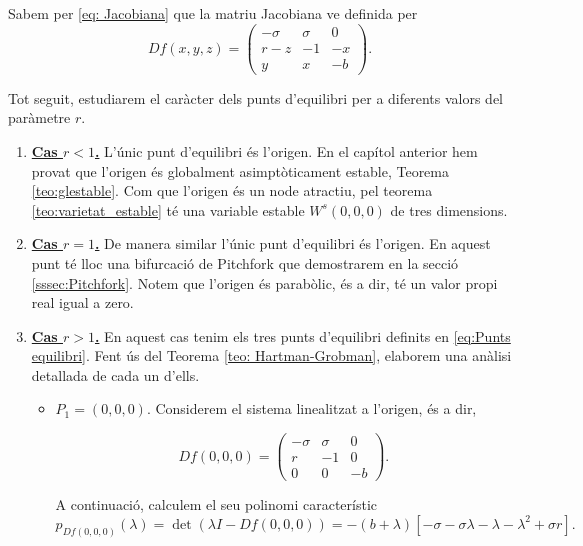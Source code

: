 \documentclass[11pt,a4paper,openright,oneside]{article}
\numberwithin{equation}{section}
\theoremstyle{definition}
\begin{document}
Sabem per \eqref{eq: Jacobiana} que la matriu Jacobiana ve definida per 
\begin{equation*} Df(x,y,z)= \begin{pmatrix}
    -\sigma & \sigma & 0\\
    r-z & -1 & -x\\
    y & x & -b
\end{pmatrix}. \end{equation*}

Tot seguit, estudiarem el caràcter dels punts d'equilibri per a diferents valors del paràmetre $r$.

\begin{enumerate}
    \item \textbf{\underline{Cas $r<1$.}} L'únic punt d'equilibri és l'origen. En el capítol anterior hem provat que l'origen és globalment asimptòticament estable, Teorema \ref{teo:glestable}. Com que l'origen és un node atractiu, pel teorema \ref{teo:varietat_estable} té una variable estable $W^s(0,0,0)$ de tres dimensions.
    
    \item \textbf{\underline{Cas $r=1$.}} De manera similar l'únic punt d'equilibri és l'origen. En aquest punt té lloc una bifurcació de Pitchfork que demostrarem en la secció \ref{sssec:Pitchfork}. Notem que l'origen és parabòlic, és a dir, té un valor propi real igual a zero.
    
    \item \textbf{\underline{Cas $r>1$.}} En aquest cas tenim els tres punts d'equilibri definits en \eqref{eq:Punts equilibri}. Fent ús del Teorema \ref{teo: Hartman-Grobman}, elaborem una anàlisi detallada de cada un d'ells.
    
    \begin{itemize}
        \item $P_1=(0,0,0)$. Considerem el sistema linealitzat a l'origen, és a dir, 
        
        \begin{equation*} Df(0,0,0)= \begin{pmatrix}
        -\sigma & \sigma & 0\\
        r & -1 & 0\\
        0 & 0 & -b
        \end{pmatrix}. \end{equation*}

        A continuació, calculem el seu polinomi característic 
        \begin{equation*}
            p_{Df(0,0,0)}(\lambda)=\det\left(\lambda I-Df(0,0,0)\right)=-(b+\lambda)\left[-\sigma-\sigma\lambda-\lambda-\lambda^{2}+\sigma r\right].
        \end{equation*}
        

\end{itemize}
\end{enumerate}
\end{document}
